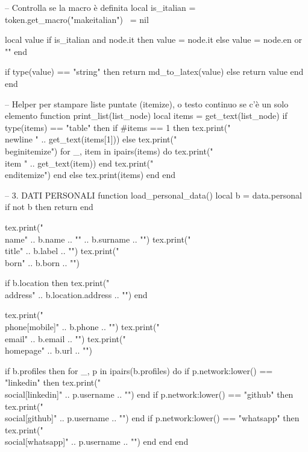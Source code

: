 \begin{luacode*}
    -- Controlla se la macro \makeitalian è definita
    local is_italian = token.get_macro("makeitalian") ~= nil

    local value
    if is_italian and node.it then
    value = node.it
    else
    value = node.en or ""
    end

    if type(value) == "string" then
    return md_to_latex(value)
    else
    return value
    end
    end

    -- Helper per stampare liste puntate (itemize), o testo continuo se c'è un solo elemento
    function print_list(list_node)
    local items = get_text(list_node)
    if type(items) == "table" then
    if #items == 1 then
    tex.print("\\newline " .. get_text(items[1]))
    else
    tex.print("\\begin{itemize}")
        for _, item in ipairs(items) do
        tex.print("\\item " .. get_text(item))
              end
              tex.print("\\end{itemize}")
    end
    else
    tex.print(items)
    end
    end

    -- 3. DATI PERSONALI
    function load_personal_data()
    local b = data.personal
    if not b then return end

    tex.print("\\name{" .. b.name .. "}{" .. b.surname .. "}")
    tex.print("\\title{" .. b.label .. "}")
    tex.print("\\born{" .. b.born .. "}")

    if b.location then
    tex.print("\\address{" .. b.location.address .. "}{}{}")
    end

    tex.print("\\phone[mobile]{" .. b.phone .. "}")
    tex.print("\\email{" .. b.email .. "}")
    tex.print("\\homepage{" .. b.url .. "}")

    if b.profiles then
    for _, p in ipairs(b.profiles) do
    if p.network:lower() == "linkedin" then tex.print("\\social[linkedin]{" .. p.username .. "}") end
    if p.network:lower() == "github"   then tex.print("\\social[github]{" .. p.username .. "}") end
    if p.network:lower() == "whatsapp" then tex.print("\\social[whatsapp]{" .. p.username .. "}") end
    end
    end


\end{luacode*}
